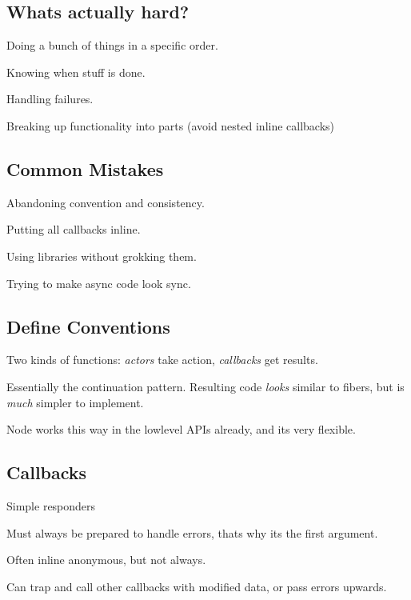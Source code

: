 \subsection*{What\textquotesingle{}s actually hard?}


\begin{DoxyItemize}
\item Doing a bunch of things in a specific order.
\item Knowing when stuff is done.
\item Handling failures.
\item Breaking up functionality into parts (avoid nested inline callbacks)
\end{DoxyItemize}

\subsection*{Common Mistakes}


\begin{DoxyItemize}
\item Abandoning convention and consistency.
\item Putting all callbacks inline.
\item Using libraries without grokking them.
\item Trying to make async code look sync.
\end{DoxyItemize}

\subsection*{Define Conventions}


\begin{DoxyItemize}
\item Two kinds of functions\+: {\itshape actors} take action, {\itshape callbacks} get results.
\item Essentially the continuation pattern. Resulting code {\itshape looks} similar to fibers, but is {\itshape much} simpler to implement.
\item Node works this way in the lowlevel A\+P\+Is already, and it\textquotesingle{}s very ﬂexible.
\end{DoxyItemize}

\subsection*{Callbacks}


\begin{DoxyItemize}
\item Simple responders
\item Must always be prepared to handle errors, that\textquotesingle{}s why it\textquotesingle{}s the first argument.
\item Often inline anonymous, but not always.
\item Can trap and call other callbacks with modified data, or pass errors upwards.
\end{DoxyItemize}

